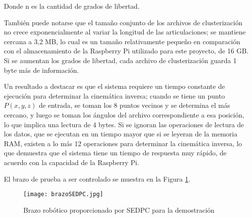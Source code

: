 Donde n es la cantidad de grados de libertad.

También puede notarse que el tamaño conjunto de los archivos de clusterización no crece exponencialmente al variar la longitud de las articulaciones; se mantiene cercana a 3,2 MB, lo cual es un tamaño relativamente pequeño en comparación con el almacenamiento de la Raspberry Pi utilizado para este proyecto, de 16 GB. Si se aumentan los grados de libertad, cada archivo de clusterización guarda 1 byte más de información.

Un resultado a destacar es que el sistema requiere un tiempo constante de ejecución para determinar la cinemática inversa; cuando se tiene un punto $P(x,y,z)$ de entrada, se toman los 8 puntos vecinos y se determina el más cercano, y luego se toman los ángulos del archivo correspondiente a esa posición, lo que implica una lectura de 4 bytes. Si se ignoran las operaciones de lectura de los datos, que se ejecutan en un tiempo mayor que si se leyeran de la memoria RAM, existen a lo más 12 operaciones para determinar la cinemática inversa, lo que demuestra que el sistema tiene un tiempo de respuesta muy rápido, de acuerdo con la capacidad de la Raspberry Pi.

El brazo de prueba a ser controlado se muestra en la Figura \ref{fig:brazoSEDPC}.

\begin{figure}[htb]
	\centering
	\texttt{[image: brazoSEDPC.jpg]}
	\caption{Brazo robótico proporcionado por SEDPC para la demostración}
	\label{fig:brazoSEDPC}
\end{figure}